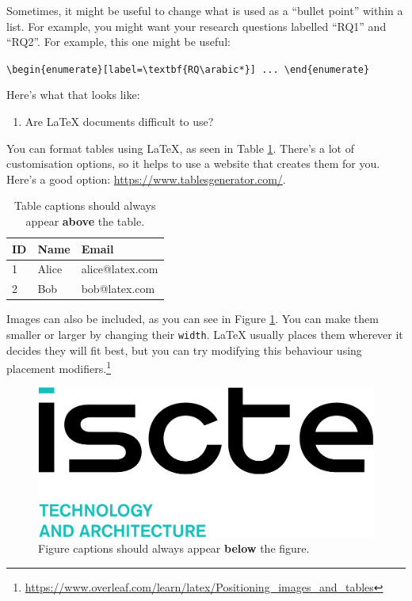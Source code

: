 \documentclass[12pt,reqno,twoside]{amsbook}
\begin{document}
\noindent Sometimes, it might be useful to change what is used as a ``bullet point'' within a list. For example, you might want your research questions labelled ``RQ1'' and ``RQ2''. For example, this one might be useful:

\begin{center}
    \verb|\begin{enumerate}[label=\textbf{RQ\arabic*}] ... \end{enumerate}|
\end{center}

\noindent Here's what that looks like:

\begin{enumerate}[label=\textbf{RQ\arabic*}] 
    \item Are LaTeX documents difficult to use?
\end{enumerate}

\noindent You can format tables using LaTeX, as seen in Table \ref{table:example}. There's a lot of customisation options, so it helps to use a website that creates them for you. Here's a good option: \url{https://www.tablesgenerator.com/}.

\begin{table}[h]
\caption{Table captions should always appear \textbf{above} the table.}
\begin{tabular}{l|l|l}
ID & Name  & Email           \\ \hline
1  & Alice & alice@latex.com \\
2  & Bob   & bob@latex.com  
\end{tabular}
\label{table:example}
\end{table}

Images can also be included, as you can see in Figure \ref{fig:example}. You can make them smaller or larger by changing their \texttt{width}. LaTeX usually places them wherever it decides they will fit best, but you can try modifying this behaviour using placement modifiers.\footnote{\url{https://www.overleaf.com/learn/latex/Positioning_images_and_tables}}

\begin{figure}
    \centering
    \includegraphics[width=0.3\linewidth]{images/ista.png}
    \caption{Figure captions should always appear \textbf{below} the figure.}
    \label{fig:example}
\end{figure}
\end{document}
